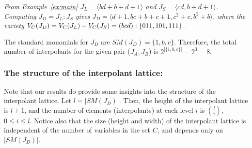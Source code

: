 \begin{Example}
\label{ex:jd}
{\it 
From Example~\ref{ex:main}
$J_L = \langle bd + b + d + 1 \rangle$ and $J_S = \langle cd, b + d+
1\rangle$. 
Computing $J_D = J_L : J_S$ gives $J_D = \langle
d+1,bc+b+c+1,c^2+c,b^2+b \rangle$, where the variety ${V_C}(J_D)={V_C}(J_L)-{V_C}(J_S)
=(bcd):\{011,101,111\}$. 

The standard monomials for $J_D$ are $SM(J_D) = \{1,b,c\}$. Therefore,
the total number of interpolants for the given pair ($J_A,J_B$) is
$2^{|\{1,b,c\}|}=2^3=8$. 
}
\end{Example}


\subsubsection{The structure of the interpolant lattice:} Note that
our results do provide some insights into the structure of the
interpolant lattice. Let $l = |SM(J_D)|$. Then, the height of the
interpolant lattice is $l + 1$, and the number of elements (interpolants) at each
level $i$ is $l \choose i$, $0\leq i \leq l$. Notice also that the size (height and
width) of the interpolant lattice is independent of the number of
variables in the set $C$, and depends only on $|SM(J_D)|$. 

